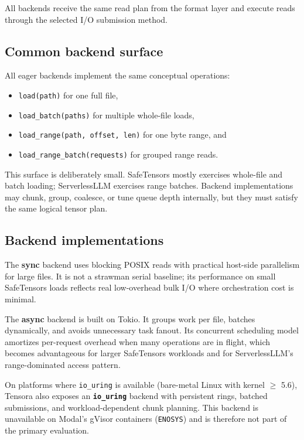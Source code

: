 All backends receive the same read plan from the format layer and execute reads through the selected I/O submission method.

\subsection{Common backend surface}

All eager backends implement the same conceptual operations:

\begin{itemize}
\item \texttt{load(path)} for one full file,
\item \texttt{load\_batch(paths)} for multiple whole-file loads,
\item \texttt{load\_range(path, offset, len)} for one byte range, and
\item \texttt{load\_range\_batch(requests)} for grouped range reads.
\end{itemize}

This surface is deliberately small. SafeTensors mostly exercises whole-file and batch loading; ServerlessLLM exercises range batches. Backend implementations may chunk, group, coalesce, or tune queue depth internally, but they must satisfy the same logical tensor plan.

\subsection{Backend implementations}

The \textbf{sync} backend uses blocking POSIX reads with practical host-side parallelism for large files. It is not a strawman serial baseline; its performance on small SafeTensors loads reflects real low-overhead bulk I/O where orchestration cost is minimal.

The \textbf{async} backend is built on Tokio. It groups work per file, batches dynamically, and avoids unnecessary task fanout. Its concurrent scheduling model amortizes per-request overhead when many operations are in flight, which becomes advantageous for larger SafeTensors workloads and for ServerlessLLM's range-dominated access pattern.

On platforms where \texttt{io\_uring} is available (bare-metal Linux with kernel $\geq$ 5.6), Tensora also exposes an \textbf{\texttt{io\_uring}} backend with persistent rings, batched submissions, and workload-dependent chunk planning. This backend is unavailable on Modal's gVisor containers (\texttt{ENOSYS}) and is therefore not part of the primary evaluation.


